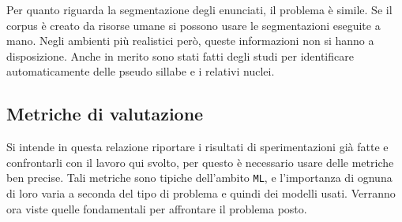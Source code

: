 \documentclass[twoside,twocolumn,10pt]{extarticle}
\theoremstyle{definition}
\begin{document}
	Per quanto riguarda la segmentazione degli enunciati, il problema è simile. Se il corpus è creato da risorse umane si possono usare le segmentazioni eseguite a mano. Negli ambienti più realistici però, queste informazioni non si hanno a disposizione. Anche in merito sono stati fatti degli studi per identificare automaticamente delle pseudo sillabe e i relativi nuclei.
	
	\subsection{Metriche di valutazione}
		Si intende in questa relazione riportare i risultati di sperimentazioni già fatte e confrontarli con il lavoro qui svolto, per questo è necessario usare delle metriche ben precise. Tali metriche sono tipiche dell'ambito \texttt{ML}, e l'importanza di ognuna di loro varia a seconda del tipo di problema e quindi dei modelli usati. Verranno ora viste quelle fondamentali per affrontare il problema posto.
		
\end{document}

